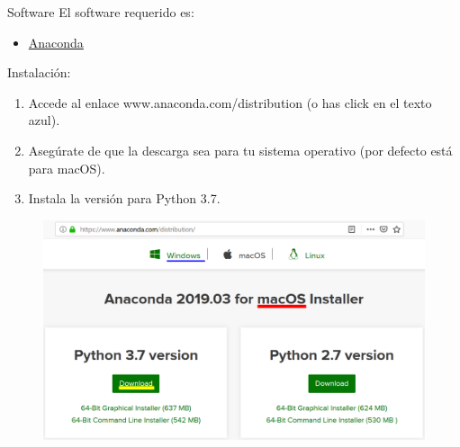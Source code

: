 \begin{frame}[t]{Software}\vspace{0pt}
El software requerido es:
\begin{itemize}
	\item \href{https://www.anaconda.com/distribution}{{\color[rgb]{0,0,1} Anaconda} }
\end{itemize}
Instalación:
\begin{enumerate}
	\item Accede al enlace www.anaconda.com/distribution (o has click en el texto azul).
	\item Aseg\'urate de que la descarga sea para tu sistema operativo (por defecto est\'a para macOS).
	\item Instala la versi\'on para Python 3.7.
\end{enumerate}

\begin{figure}
	\includegraphics[scale=0.35]{Images/Anaconda.png}
\end{figure}

\end{frame}